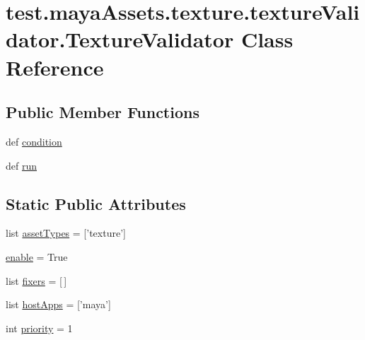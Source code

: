 \hypertarget{classtest_1_1mayaAssets_1_1texture_1_1textureValidator_1_1TextureValidator}{\section{test.\-maya\-Assets.\-texture.\-texture\-Validator.\-Texture\-Validator \-Class \-Reference}
\label{d2/d2a/classtest_1_1mayaAssets_1_1texture_1_1textureValidator_1_1TextureValidator}
}
\subsection*{\-Public \-Member \-Functions}
\begin{DoxyCompactItemize}
\item 
def \hyperlink{classtest_1_1mayaAssets_1_1texture_1_1textureValidator_1_1TextureValidator_a5b5c5fa495a2b639025cf279ff974255}{condition}
\item 
def \hyperlink{classtest_1_1mayaAssets_1_1texture_1_1textureValidator_1_1TextureValidator_a2172305d8210a760054a5bd2c19bd72c}{run}
\end{DoxyCompactItemize}
\subsection*{\-Static \-Public \-Attributes}
\begin{DoxyCompactItemize}
\item 
list \hyperlink{classtest_1_1mayaAssets_1_1texture_1_1textureValidator_1_1TextureValidator_a355adef72ba6390ba1a06ecb08f10504}{asset\-Types} = \mbox{[}'texture'\mbox{]}
\item 
\hyperlink{classtest_1_1mayaAssets_1_1texture_1_1textureValidator_1_1TextureValidator_a1649c8e7ebd1b89eb6f9185e7f654e8d}{enable} = \-True
\item 
list \hyperlink{classtest_1_1mayaAssets_1_1texture_1_1textureValidator_1_1TextureValidator_a44b4846d6d591228eba224685676cdf5}{fixers} = \mbox{[}$\,$\mbox{]}
\item 
list \hyperlink{classtest_1_1mayaAssets_1_1texture_1_1textureValidator_1_1TextureValidator_a798940c9fe7c236da2459ea5934a2712}{host\-Apps} = \mbox{[}'maya'\mbox{]}
\item 
int \hyperlink{classtest_1_1mayaAssets_1_1texture_1_1textureValidator_1_1TextureValidator_a22be4c65ac93e5f482d2adbf1b09760d}{priority} = 1
\end{DoxyCompactItemize}


